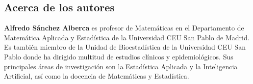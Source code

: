 \documentclass[10pt,twoside,spanish]{article}
\numberwithin{equation}{section}
\begin{document}
\subsection*{Acerca de los autores}%

\textbf{Alfredo Sánchez Alberca} es profesor de Matemáticas en el Departamento de Matemática Aplicada y Estadística de la Universidad
CEU San Pablo de Madrid. Es también miembro de la Unidad de Bioestadística de la Universidad CEU San Pablo donde ha
dirigido multitud de estudios clínicos y epidemiológicos. Sus principales áreas de investigación son la Estadística
Aplicada y la Inteligencia Artificial, así como la docencia de Matemáticas y Estadística. 
\end{document}
